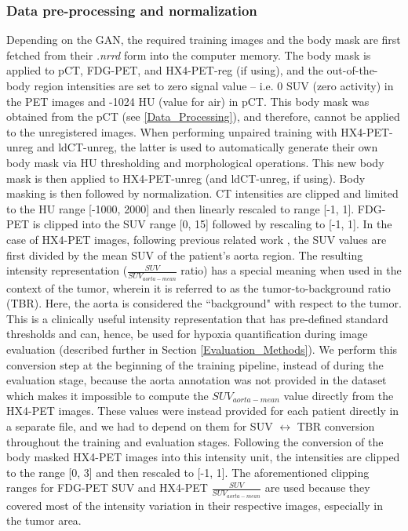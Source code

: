 \subsubsection{Data pre-processing and normalization}
Depending on the GAN, the required training images and the body mask are first fetched from their \textit{.nrrd} form into the computer memory. The body mask is applied to pCT, FDG-PET, and HX4-PET-reg (if using), and the out-of-the-body region intensities are set to zero signal value -- i.e. 0 SUV (zero activity) in the PET images and -1024 HU (value for air) in pCT. This body mask was obtained from the pCT (see \ref{Data_Processing}), and therefore, cannot be applied to the unregistered images. When performing unpaired training with HX4-PET-unreg and ldCT-unreg, the latter is used to automatically generate their own body mask via HU thresholding and morphological operations. This new body mask is then applied to HX4-PET-unreg (and ldCT-unreg, if using). Body masking is then followed by normalization. CT intensities are clipped and limited to the HU range [-1000, 2000] and then linearly rescaled to range [-1, 1]. FDG-PET is clipped into the SUV range [0, 15] followed by rescaling to [-1, 1]. In the case of HX4-PET images, following previous related work \cite{even2017predicting}, the SUV values are first divided by the mean SUV of the patient's aorta region. The resulting intensity representation ($\frac{SUV}{SUV_{aorta-mean}}$ ratio) has a special meaning when used in the context of the tumor, wherein it is referred to as the tumor-to-background ratio (TBR). Here, the aorta is considered the ``background" with respect to the tumor. This is a clinically useful intensity representation that has pre-defined standard thresholds \cite{zegers2013hypoxia} and can, hence, be used for hypoxia quantification during image evaluation (described further in Section \ref{Evaluation_Methods}). We perform this conversion step at the beginning of the training pipeline, instead of during the evaluation stage, because the aorta annotation was not provided in the dataset which makes it impossible to compute the $SUV_{aorta-mean}$ value directly from the HX4-PET images. These values were instead provided for each patient directly in a separate file, and we had to depend on them for SUV $\leftrightarrow$ TBR conversion throughout the training and evaluation stages. Following the conversion of the body masked HX4-PET images into this intensity unit, the intensities are clipped to the range [0, 3] and then rescaled to [-1, 1]. The aforementioned clipping ranges for FDG-PET SUV and HX4-PET $\frac{SUV}{SUV_{aorta-mean}}$ are used because they covered most of the intensity variation in their respective images, especially in the tumor area.

